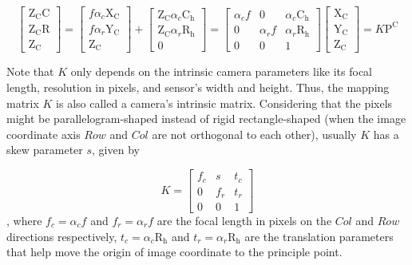 \begin{equation}
\left[ \begin{array}{c} \text{Z}_\text{C} \text{C} \\ \text{Z}_\text{C} \text{R} \\ \text{Z}_\text{C}  \end{array} \right] %
= %
\left[ \begin{array}{c} f\alpha_c\text{X}_\text{C} \\ f\alpha_r\text{Y}_\text{C} \\ \text{Z}_\text{C} \end{array} \right]%
+
\left[ \begin{array}{c}  \text{Z}_\text{C}\alpha_c\text{C}_\text{h} \\ \text{Z}_\text{C}\alpha_r\text{R}_\text{h} \\ 0 \end{array} \right] %
=  \begin{bmatrix} \alpha_cf & 0 &  \alpha_c\text{C}_\text{h}  \\ 0 & \alpha_rf & \alpha_r\text{R}_\text{h} \\ 0 & 0 & 1 \end{bmatrix}%
\left[ \begin{array}{c} \text{X}_\text{C} \\ \text{Y}_\text{C} \\ \text{Z}_\text{C} \end{array} \right]%
= K\text{P}^\text{C}
\label{HomoProportionalFromCamToImInPixels}
\end{equation}%

\noindent
Note that \(K\) only depends on the intrinsic camera parameters like its focal length, resolution in pixels, and sensor's width and height. Thus, the mapping matrix \(K\) is also called a camera's intrinsic matrix. Considering that the pixels might be parallelogram-shaped instead of rigid rectangle-shaped (when the image coordinate axis \(Row\) and \(Col\) are not orthogonal to each other), usually \(K\) has a skew parameter \(s\), given by

\begin{equation}
K%
=  \begin{bmatrix} 
f_c & s & t_c \\
 0 & f_r & t_r \\
 0 & 0 & 1 \end{bmatrix}%
\label{intrinsicKmatrix}
\end{equation} , %
\noindent
where \(f_c = \alpha_cf\) and \(f_r = \alpha_rf\) are the focal length in pixels on the \(Col\) and \(Row\) directions respectively,  \(t_c = \alpha_c\text{R}_\text{h}\) and \(t_r = \alpha_r\text{R}_\text{h}\) are the translation parameters that help move the origin of image coordinate to the principle point.\\

